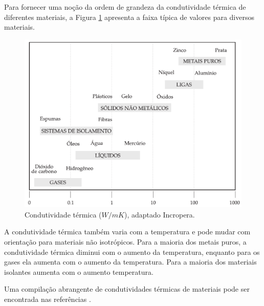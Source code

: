 Para fornecer uma noção da ordem de grandeza da condutividade térmica de diferentes materiais, a Figura \ref{fig:escalacondutividade} apresenta a faixa típica de valores para diversos materiais.

\begin{figure}[H]
\centering
\includegraphics[scale=1]{figuras/cap1/condutividade.pdf}
\caption{Condutividade térmica ($W/mK$), adaptado Incropera.}
\label{fig:escalacondutividade}
\end{figure}

A condutividade térmica também varia com a temperatura e pode mudar com orientação para materiais não isotrópicos. Para a maioria dos metais puros, a condutividade térmica diminui com o aumento da temperatura, enquanto para os gases ela aumenta com o aumento da temperatura. Para a maioria dos materiais isolantes aumenta com o aumento temperatura. 

Uma compilação abrangente de condutividades térmicas de materiais pode ser encontrada nas referências \textcite{arpaci1966, ozisik1993}.

\printbibliography[heading=subbibliography]

